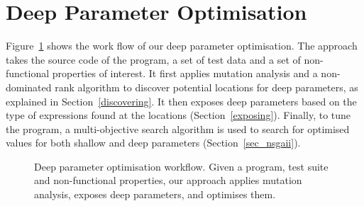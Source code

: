 \vspace{-1.2em}
\section{Deep Parameter Optimisation}
\label{sec_deep_parameter_optimisation}

Figure~\ref{system} shows the work flow of our deep parameter optimisation. The approach takes the source code of the program, a set of test data and a set of non-functional properties of interest. 
It first applies mutation analysis and a non-dominated rank algorithm to discover potential locations for deep parameters, as explained in Section~\ref{discovering}. It then exposes deep parameters based on the type of expressions found at the locations (Section~\ref{exposing}). Finally, to tune the program, a multi-objective search algorithm is used to search for optimised values for both shallow and deep parameters (Section~\ref{sec_nsgaii}).

\begin{figure}[htbp]
\centering
\vspace{-0.5em}
\vspace{-1.8em}
\caption{Deep parameter optimisation workflow. Given a program, test suite and non-functional properties, our approach applies mutation analysis, exposes deep parameters, and optimises them.}\label{system}
\vspace{-1.9em}
\end{figure}

